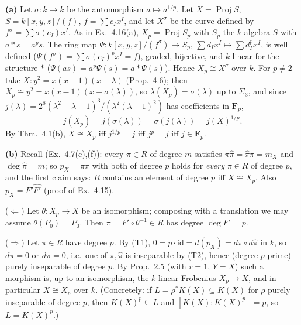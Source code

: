 \documentclass[11pt]{article}
\begin{document}
\textbf{(a)} Let $\sigma:k\to k$ be the automorphism $a\mapsto a^{1/p}$. Let $X=\operatorname{Proj}S$, $S=k[x,y,z]/(f)$, $f=\sum c_Ix^I$, and let $X^\sigma$ be the curve defined by $f^\sigma=\sum\sigma(c_I)x^I$. As in Ex.~4.16(a), $X_p=\operatorname{Proj}S_p$ with $S_p$ the $k$-algebra $S$ with $a*s=a^ps$. The ring map $\Psi:k[x,y,z]/(f^\sigma)\to S_p$, $\sum d_Ix^I\mapsto\sum d_I^px^I$, is well defined ($\Psi(f^\sigma)=\sum\sigma(c_I)^px^I=f$), graded, bijective, and $k$-linear for the structure $*$ ($\Psi(as)=a^p\Psi(s)=a*\Psi(s)$). Hence $X_p\cong X^\sigma$ over $k$. For $p\neq2$ take $X:y^2=x(x-1)(x-\lambda)$ (Prop.~4.6); then $X_p\cong y^2=x(x-1)(x-\sigma(\lambda))$, so $\lambda(X_p)=\sigma(\lambda)$ up to $\Sigma_3$, and since $j(\lambda)=2^8(\lambda^2-\lambda+1)^3/(\lambda^2(\lambda-1)^2)$ has coefficients in $\mathbf F_p$,
\[
j(X_p)=j(\sigma(\lambda))=\sigma(j(\lambda))=j(X)^{1/p}.
\]
By Thm.~4.1(b), $X\cong X_p$ iff $j^{1/p}=j$ iff $j^p=j$ iff $j\in\mathbf F_p$.

\textbf{(b)} Recall (Ex.~4.7(c),(f)): every $\pi\in R$ of degree $m$ satisfies $\pi\widehat\pi=\widehat\pi\pi=m_X$ and $\deg\widehat\pi=m$; so $p_X=\pi\widehat\pi$ with both of degree $p$ holds for \emph{every} $\pi\in R$ of degree $p$, and the first claim says: $R$ contains an element of degree $p$ iff $X\cong X_p$. Also $p_X=F'\widehat{F'}$ (proof of Ex.~4.15).

($\Leftarrow$) Let $\theta:X_p\to X$ be an isomorphism; composing with a translation we may assume $\theta(P_0)=P_0$. Then $\pi=F'\circ\theta^{-1}\in R$ has degree $\deg F'=p$.

($\Rightarrow$) Let $\pi\in R$ have degree $p$. By (T1), $0=p\cdot\mathrm{id}=d(p_X)=d\pi\circ d\widehat\pi$ in $k$, so $d\pi=0$ or $d\widehat\pi=0$, i.e.\ one of $\pi,\widehat\pi$ is inseparable by (T2), hence (degree $p$ prime) purely inseparable of degree $p$. By Prop.~2.5 (with $r=1$, $Y=X$) such a morphism is, up to an isomorphism, the $k$-linear Frobenius $X_p\to X$, and in particular $X\cong X_p$ over $k$. (Concretely: if $L=\rho^*K(X)\subseteq K(X)$ for $\rho$ purely inseparable of degree $p$, then $K(X)^p\subseteq L$ and $[K(X):K(X)^p]=p$, so $L=K(X)^p$.)
\end{document}
